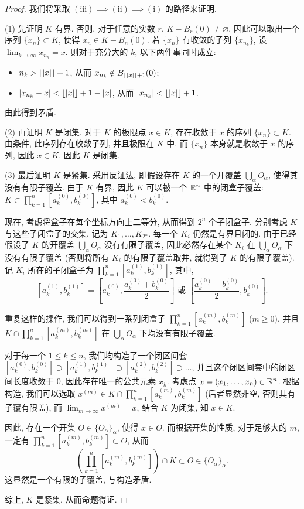 \documentclass{article}
\begin{document}
\begin{proof}
	我们将采取 $\mathrm{(iii)\implies (ii) \implies (i)}$ 的路径来证明. 

	(1) 先证明 $K$ 有界. 否则, 对于任意的实数 $r$, $K-B_r(0)\neq\varnothing$. 因此可以取出一个序列 $\{x_n\} \subset K$, 使得 $x_n\in K-B_n(0)$. 若 $\{x_n\}$ 有收敛的子列 $\{x_{n_k}\} $, 设 $\lim_{ k \to \infty } x_{n_k} = x$. 则对于充分大的 $k$, 以下两件事同时成立: 
	\begin{itemize}
		\item $n_k>\left\lfloor |x| \right\rfloor+1$, 从而 $x_{n_k}\notin B_{\left\lfloor |x| \right\rfloor+1}(0)$;
		\item $|x_{n_k}-x|<\left\lfloor |x| \right\rfloor+1-|x|$, 从而 $|x_{n_k}| < \left\lfloor |x| \right\rfloor+1$.
	\end{itemize}
	由此得到矛盾.

	(2) 再证明 $K$ 是闭集. 对于 $K$ 的极限点 $x\in\overline{K}$, 存在收敛于 $x$ 的序列 $\{x_n\} \subset K$. 由条件, 此序列存在收敛子列, 并且极限在 $K$ 中. 而 $\{x_n\}$ 本身就是收敛于 $x$ 的序列, 因此 $x\in K$. 因此 $K$ 是闭集.

	(3) 最后证明 $K$ 是紧集. 采用反证法, 即假设存在 $K$ 的一个开覆盖 $\bigcup_\alpha O_\alpha$, 使得其没有有限子覆盖. 由于 $K$ 有界, 因此 $K$ 可以被一个 $\mathbb{R}^n$ 中的闭盒子覆盖: $K\subset \prod_{k=1}^{n} [a_k^{(0)},b_k^{(0)}]$, 其中 $a_k^{(0)}<b_k^{(0)}$. 

	现在, 考虑将盒子在每个坐标方向上二等分, 从而得到 $2^n$ 个子闭盒子. 分别考虑 $K$ 与这些子闭盒子的交集, 记为 $K_1,\dots,K_{2^n}$. 每一个 $K_i$ 仍然是有界且闭的. 由于已经假设了 $K$ 的开覆盖 $\bigcup_\alpha O_\alpha$ 没有有限子覆盖, 因此必然存在某个 $K_i$ 在 $\bigcup_\alpha O_\alpha$ 下没有有限子覆盖 (否则将所有 $K_i$ 的有限子覆盖取并, 就得到了 $K$ 的有限子覆盖). 记 $K_i$ 所在的子闭盒子为 $\prod_{k=1}^{n} [a_k^{(1)},b_k^{(1)}]$, 其中, 
	\[ [a_k^{(1)},b_k^{(1)}] = \left[a_k^{(0)},\frac{a_k^{(0)}+b_k^{(0)}}{2}\right] \text{ 或 } \left[\frac{a_k^{(0)}+b_k^{(0)}}{2}, b_k^{(0)}\right]. \]

	重复这样的操作, 我们可以得到一系列闭盒子 $\prod_{k=1}^{n} [a_k^{(m)},b_k^{(m)}]$ ($m \geq 0$), 并且 $K\cap \prod_{k=1}^{n} [a_k^{(m)},b_k^{(m)}]$ 在 $\bigcup_\alpha O_\alpha$ 下均没有有限子覆盖.

	对于每一个 $1\le k\le n$, 我们均构造了一个闭区间套 $[a_k^{(0)},b_k^{(0)}] \supset [a_k^{(1)},b_k^{(1)}] \supset [a_k^{(2)},b_k^{(2)}] \supset\dots$, 并且这个闭区间套中的闭区间长度收敛于 $0$, 因此存在唯一的公共元素 $x_k$. 考虑点 $x=(x_1,\dots,x_n)\in \mathbb{R}^n$. 根据构造, 我们可以选取 $x^{(m)}\in K\cap\prod_{k=1}^{n} [a_k^{(m)},b_k^{(m)}]$ (后者显然非空, 否则其有子覆有限盖), 而 $\lim_{ m \to \infty } x^{(m)}=x$, 结合 $K$ 为闭集, 知 $x\in K$. 

	因此, 存在一个开集 $O\in\{O_\alpha\}_\alpha $, 使得 $x\in O$. 而根据开集的性质, 对于足够大的 $m$, 一定有 $\prod_{k=1}^{n} [a_k^{(m)},b_k^{(m)}]\subset O$, 从而
	\[ \left( \prod_{k=1}^{n} [a_k^{(m)},b_k^{(m)}] \right) \cap K \subset O \in \{O_\alpha\}_\alpha. \]
	这显然是一个有限的子覆盖, 与构造矛盾.

	综上, $K$ 是紧集, 从而命题得证.
\end{proof}
\end{document}
